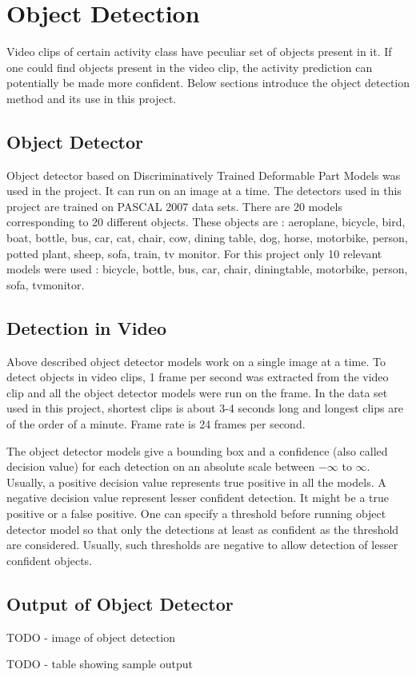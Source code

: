 \chapter{Object Detection}

\label{ch3_OBJ}


Video clips of certain activity class have peculiar set of objects present in it.
If one could find objects present in the video clip, the activity prediction can 
potentially be made more confident. Below sections introduce the object detection
method and its use in this project.

\section{Object Detector}
Object detector based on Discriminatively Trained Deformable Part Models \cite{voc-release4} was used in
the project. It can run on an image at a time. The detectors used in this project are trained on PASCAL 2007 data sets.
There are 20 models corresponding to 20 different objects.
These objects are : aeroplane, bicycle,
bird, boat, bottle, bus, car, cat, chair, cow, dining table, dog, horse,
motorbike, person, potted plant, sheep, sofa, train, tv monitor.
For this project only 10 relevant models were used : bicycle, bottle, bus, car,
chair, diningtable, motorbike, person, sofa, tvmonitor.

\section{Detection in Video}
Above described object detector models work on a single image at a time. To detect objects in video clips, 1 frame per second was extracted from the video clip and all the object detector models were run on the frame. In the data set used in this project, shortest clips is about 3-4 seconds long and longest clips are of the order of a minute. Frame rate is 24 frames per second.

The object detector models give a bounding box and a confidence (also called decision value) for each detection 
on an absolute scale between $-\infty$ to $\infty$. 
Usually, a positive decision value represents true positive in all the models. 
A negative decision value represent lesser confident detection. 
It might be a true positive or a false positive. 
One can specify a threshold before running object detector model 
so that only the detections at least as confident as the threshold are considered.
Usually, such thresholds are negative to allow detection of lesser confident objects.

\section{Output of Object Detector}
TODO - image of object detection

TODO - table showing sample output
